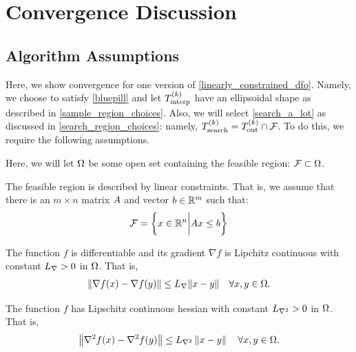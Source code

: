 \section{Convergence Discussion}

\subsection{Algorithm Assumptions}

Here, we show convergence for one version of \cref{linearly_constrained_dfo}.
Namely, we choose to satisfy \cref{bluepill} and let ${T_{\text{interp}}^{(k)}}$ have an ellipsoidal shape as described in \cref{sample_region_choices}. 
Also, we will select \cref{search_a_lot} as discussed in \cref{search_region_choices}: namely, ${T_{\text{search}}^{(k)}} = {T_{\text{out}}^{(k)}} \cap {\mathcal F}$.
To do this, we require the following assumptions.

Here, we will let $\Omega$ be some open set containing the feasible region: ${\mathcal F} \subset \Omega$.

\begin{assumption}
\label{the_constraints_are_linear}
The feasible region is described by linear constraints.
That is, we assume that there is an $m \times n$ matrix ${A}$ and vector ${b} \in \mathbb R^m$ such that:
\begin{align*}
{\mathcal F} = \left\{x \in \mathbb R^n \bigg | {A} x \le {b} \right\}
\end{align*}
\end{assumption}

\begin{assumption}
\label{lipschitz_gradient}
The function $f$ is differentiable and its gradient $\nabla f$ is Lipchitz continuous with constant ${L_{\nabla}} > 0$ in $\Omega$.
That is,
\begin{align}
\|\nabla f(x) - \nabla f(y)\| \le {L_{\nabla}} \|x - y\| \quad \forall x, y \in \Omega.
\end{align}
\end{assumption}

\begin{assumption}
\label{for_fully_quadratic}
\label{lipschitz_hessian}
The function $f$ has Lipschitz continuous hessian with constant ${L_{\nabla^2}} > 0$ in $\Omega$.
That is,
\begin{align}
\left\|\nabla^2 f(x) - \nabla^2 f(y)\right\| \le {L_{\nabla^2}} \left\|x - y\right\| \quad \forall x, y \in \Omega.
\end{align}
\end{assumption}

